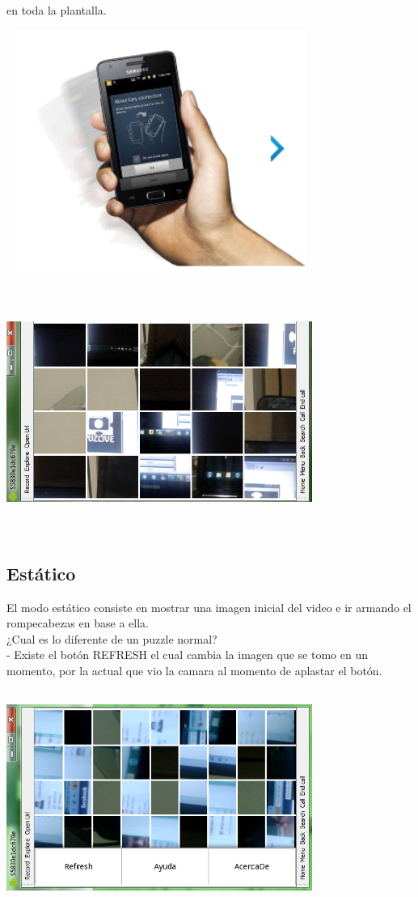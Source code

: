 \documentclass[10pt]{article}
\begin{document}
	en toda la plantalla.
	\begin{center}
	\includegraphics[height=8cm,width=10cm]{shake.png}
	\end{center}	
	\begin{center}
	\includegraphics[height=8cm,width=10cm]{inter.png}
	\end{center}	
	\subsection{Est\'atico}
		El modo est\'atico consiste en mostrar una imagen inicial del video e ir armando el rompecabezas en base a ella. 
	\\¿Cual es lo diferente de un puzzle normal?
	\\ - Existe el bot\'on REFRESH el cual cambia la imagen que se tomo en un momento, por la actual que vio la camara al momento de aplastar el bot\'on. 
	\begin{center}
	\includegraphics[height=7cm,width=10cm]{refresh.png}
	\end{center}	
\end{document}
